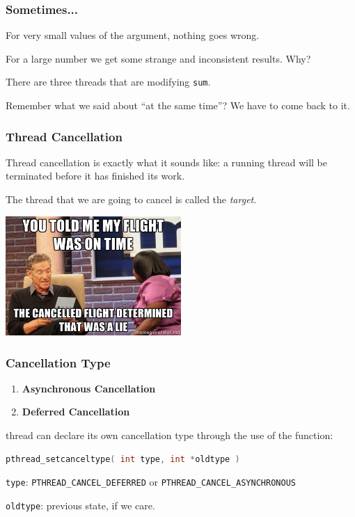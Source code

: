 \begin{frame}
	\frametitle{Sometimes...}

	For very small values of the argument, nothing goes wrong.

	For a large number we get some strange and inconsistent results. Why?

	There are three threads that are modifying \texttt{sum}.

	Remember what we said about ``at the same time''? We have to come back to it.

\end{frame}

\begin{frame}
	\frametitle{Thread Cancellation}

	Thread cancellation is exactly what it sounds like: a running thread will be terminated before it has finished its work.

	The thread that we are going to cancel is called the \textit{target}.

	\begin{center}
		\includegraphics[width=0.5\textwidth]{images/canceled_flight.jpg}
	\end{center}

\end{frame}


\begin{frame}[fragile]
	\frametitle{Cancellation Type}

	\begin{enumerate}
		\item \textbf{Asynchronous Cancellation}
		\item \textbf{Deferred Cancellation}
	\end{enumerate}

	thread can declare its own cancellation type through the use of the function:
	\begin{lstlisting}[language=C]
pthread_setcanceltype( int type, int *oldtype )
\end{lstlisting}

	\texttt{type}: \texttt{PTHREAD\_CANCEL\_DEFERRED} or \texttt{PTHREAD\_CANCEL\_ASYNCHRONOUS}

	\texttt{oldtype}: previous state, if we care.

\end{frame}

